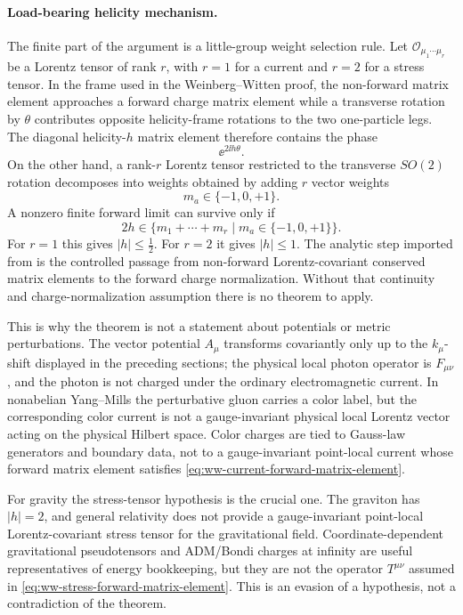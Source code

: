 \paragraph{Load-bearing helicity mechanism.}
The finite part of the argument is a little-group weight selection rule.  Let
\(\mathcal O_{\mu_1\cdots\mu_r}\) be a Lorentz tensor of rank \(r\), with
\(r=1\) for a current and \(r=2\) for a stress tensor.  In the frame used in
the Weinberg--Witten proof, the non-forward matrix element approaches a
forward charge matrix element while a transverse rotation by \(\theta\)
contributes opposite helicity-frame rotations to the two one-particle legs.
The diagonal helicity-\(h\) matrix element therefore contains the phase
\[
  \ee^{2\ii h\theta}.
\]
On the other hand, a rank-\(r\) Lorentz tensor restricted to the transverse
\(SO(2)\) rotation decomposes into weights obtained by adding \(r\) vector
weights
\[
  m_a\in\{-1,0,+1\}.
\]
A nonzero finite forward limit can survive only if
\begin{equation}
  2h\in
  \{m_1+\cdots+m_r\mid m_a\in\{-1,0,+1\}\}.
  \label{eq:ww-helicity-weight-selection}
\end{equation}
For \(r=1\) this gives \(|h|\le \frac12\).  For \(r=2\) it gives
\(|h|\le1\).  The analytic step imported from
\cite{WeinbergWitten1980} is the controlled passage from non-forward
Lorentz-covariant conserved matrix elements to the forward charge
normalization.  Without that continuity and charge-normalization assumption
there is no theorem to apply.

This is why the theorem is not a statement about potentials or metric
perturbations.  The vector potential \(A_\mu\) transforms covariantly only up
to the \(k_\mu\)-shift displayed in
the preceding sections;
the physical local photon operator is \(F_{\mu\nu}\), and the photon is not
charged under the ordinary electromagnetic current.  In nonabelian Yang--Mills
the perturbative gluon carries a color label, but the corresponding color
current is not a gauge-invariant physical local Lorentz vector acting on the
physical Hilbert space.  Color charges are tied to Gauss-law generators and
boundary data, not to a gauge-invariant point-local current whose forward
matrix element satisfies
\eqref{eq:ww-current-forward-matrix-element}.

For gravity the stress-tensor hypothesis is the crucial one.  The graviton has
\(|h|=2\), and general relativity does not provide a gauge-invariant
point-local Lorentz-covariant stress tensor for the gravitational field.
Coordinate-dependent gravitational pseudotensors and ADM/Bondi charges at
infinity are useful representatives of energy bookkeeping, but they are not
the operator \(T^{\mu\nu}\) assumed in
\eqref{eq:ww-stress-forward-matrix-element}.  This is an evasion of a
hypothesis, not a contradiction of the theorem.

